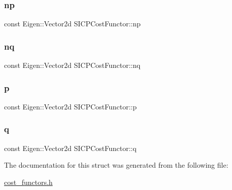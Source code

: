 \subsubsection{\texorpdfstring{np}{np}}
{\footnotesize\ttfamily const Eigen\+::\+Vector2d S\+I\+C\+P\+Cost\+Functor\+::np}

\mbox{\label{structSICPCostFunctor_a1972078dd4e688e490e9dc006411091b}} 
\subsubsection{\texorpdfstring{nq}{nq}}
{\footnotesize\ttfamily const Eigen\+::\+Vector2d S\+I\+C\+P\+Cost\+Functor\+::nq}

\mbox{\label{structSICPCostFunctor_a79feb9473e7de7507682b8631c997fd5}} 
\subsubsection{\texorpdfstring{p}{p}}
{\footnotesize\ttfamily const Eigen\+::\+Vector2d S\+I\+C\+P\+Cost\+Functor\+::p}

\mbox{\label{structSICPCostFunctor_abf544d510d7f9f1044b8ded8a6974ca0}} 
\subsubsection{\texorpdfstring{q}{q}}
{\footnotesize\ttfamily const Eigen\+::\+Vector2d S\+I\+C\+P\+Cost\+Functor\+::q}



The documentation for this struct was generated from the following file\+:\begin{DoxyCompactItemize}
\item 
\hyperlink{cost__functors_8h}{cost\+\_\+functors.\+h}\end{DoxyCompactItemize}
